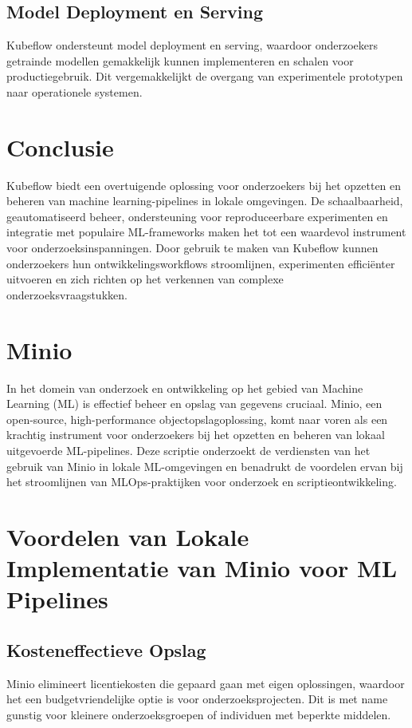 \subsection{Model Deployment en Serving}
Kubeflow ondersteunt model deployment en serving, waardoor onderzoekers getrainde modellen gemakkelijk kunnen implementeren en schalen voor productiegebruik. Dit vergemakkelijkt de overgang van experimentele prototypen naar operationele systemen.

\section{Conclusie}

Kubeflow biedt een overtuigende oplossing voor onderzoekers bij het opzetten en beheren van machine learning-pipelines in lokale omgevingen. De schaalbaarheid, geautomatiseerd beheer, ondersteuning voor reproduceerbare experimenten en integratie met populaire ML-frameworks maken het tot een waardevol instrument voor onderzoeksinspanningen. Door gebruik te maken van Kubeflow kunnen onderzoekers hun ontwikkelingsworkflows stroomlijnen, experimenten efficiënter uitvoeren en zich richten op het verkennen van complexe onderzoeksvraagstukken.
\section{Minio}

In het domein van onderzoek en ontwikkeling op het gebied van Machine Learning (ML) is effectief beheer en opslag van gegevens cruciaal. Minio, een open-source, high-performance objectopslagoplossing, komt naar voren als een krachtig instrument voor onderzoekers bij het opzetten en beheren van lokaal uitgevoerde ML-pipelines. Deze scriptie onderzoekt de verdiensten van het gebruik van Minio in lokale ML-omgevingen en benadrukt de voordelen ervan bij het stroomlijnen van MLOps-praktijken voor onderzoek en scriptieontwikkeling.

\section{Voordelen van Lokale Implementatie van Minio voor ML Pipelines}

\subsection{Kosteneffectieve Opslag}
Minio elimineert licentiekosten die gepaard gaan met eigen oplossingen, waardoor het een budgetvriendelijke optie is voor onderzoeksprojecten. Dit is met name gunstig voor kleinere onderzoeksgroepen of individuen met beperkte middelen.

